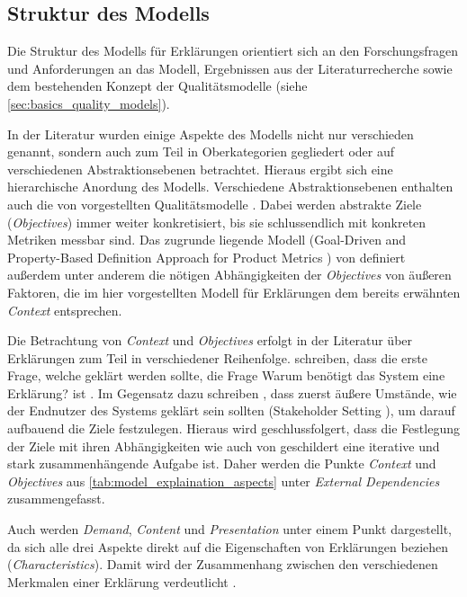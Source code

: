 \subsection{Struktur des Modells}

Die Struktur des Modells für Erklärungen orientiert sich an den Forschungsfragen und Anforderungen an das Modell, Ergebnissen aus der Literaturrecherche sowie dem bestehenden Konzept der Qualitätsmodelle \cite{schneider2012abenteuer} (siehe \autoref{sec:basics_quality_models}).

In der Literatur wurden einige Aspekte des Modells nicht nur verschieden genannt, sondern auch zum Teil in Oberkategorien gegliedert oder auf verschiedenen Abstraktionsebenen betrachtet. Hieraus ergibt sich eine hierarchische Anordung des Modells. Verschiedene Abstraktionsebenen enthalten auch die von \citeauthor{schneider2012abenteuer} vorgestellten Qualitätsmodelle \cite{schneider2012abenteuer}. Dabei werden abstrakte Ziele (\textit{Objectives}) immer weiter konkretisiert, bis sie schlussendlich mit konkreten Metriken messbar sind. Das zugrunde liegende Modell (\glqq Goal-Driven and Property-Based Definition Approach for Product Metrics\grqq{} \cite{briand1995goal}) von \citeauthor{briand1995goal} definiert außerdem unter anderem die nötigen Abhängigkeiten der \textit{Objectives} von äußeren Faktoren, die im hier vorgestellten Modell für Erklärungen dem bereits erwähnten \textit{Context} entsprechen.

Die Betrachtung von \textit{Context} und \textit{Objectives} erfolgt in der Literatur über Erklärungen zum Teil in verschiedener Reihenfolge. \citeauthor{rosenfeld_explainability_2019} schreiben, dass die erste Frage, welche geklärt werden sollte, die Frage \glqq Warum benötigt das System eine Erklärung?\grqq{} ist \cite[vgl. S. 699][]{rosenfeld_explainability_2019}\cite{nunes_systematic_2017}. Im Gegensatz dazu schreiben \citeauthor{cirqueira_scenario-based_2020}, dass zuerst äußere Umstände, wie der Endnutzer des Systems geklärt sein sollten (\glqq Stakeholder Setting\grqq{} \cite{cirqueira_scenario-based_2020}), um darauf aufbauend die Ziele festzulegen. Hieraus wird geschlussfolgert, dass die Festlegung der Ziele mit ihren Abhängigkeiten wie auch von \cite{schneider2012abenteuer} geschildert eine iterative und stark zusammenhängende Aufgabe ist. Daher werden die Punkte \textit{Context} und \textit{Objectives} aus \autoref{tab:model_explaination_aspects} unter \textit{External Dependencies} zusammengefasst.

Auch werden \textit{Demand}, \textit{Content} und \textit{Presentation} unter einem Punkt dargestellt, da sich alle drei Aspekte direkt auf die Eigenschaften von Erklärungen beziehen (\textit{Characteristics}). Damit wird der Zusammenhang zwischen den verschiedenen Merkmalen einer Erklärung verdeutlicht \cite{nunes_systematic_2017}.

